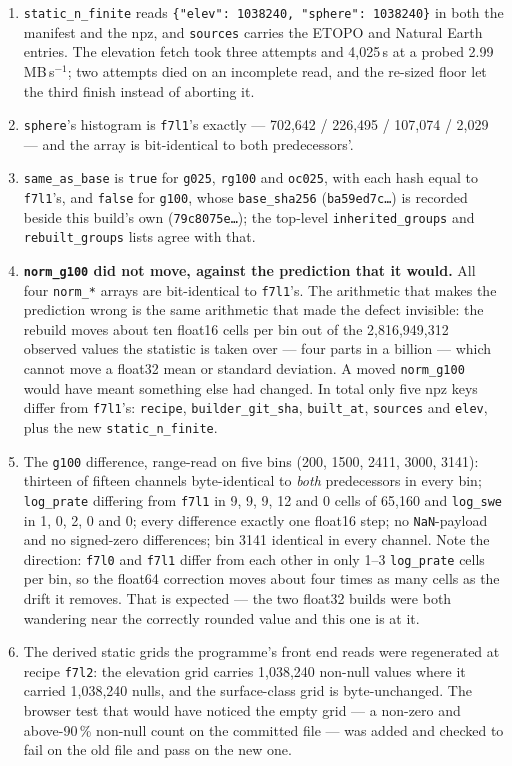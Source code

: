 \documentclass[10pt]{article}
\newcommand{\code}[1]{\texttt{#1}}
\begin{document}
\begin{enumerate}\itemsep1pt
\item \code{static\_n\_finite} reads \code{\{"elev": 1038240, "sphere":
1038240\}} in both the manifest and the npz, and \code{sources} carries the
ETOPO and Natural Earth entries. The elevation fetch took three attempts and
4,025\,s at a probed 2.99\,MB\,s$^{-1}$; two attempts died on an incomplete
read, and the re-sized floor let the third finish instead of aborting it.
\item \code{sphere}'s histogram is \code{f7l1}'s exactly --- 702,642 / 226,495
/ 107,074 / 2,029 --- and the array is bit-identical to both predecessors'.
\item \code{same\_as\_base} is \code{true} for \code{g025}, \code{rg100} and
\code{oc025}, with each hash equal to \code{f7l1}'s, and \code{false} for
\code{g100}, whose \code{base\_sha256} (\code{ba59ed7c\dots}) is recorded
beside this build's own (\code{79c8075e\dots}); the top-level
\code{inherited\_groups} and \code{rebuilt\_groups} lists agree with that.
\item \textbf{\code{norm\_g100} did not move, against the prediction that it
would.} All four \code{norm\_*} arrays are bit-identical to \code{f7l1}'s. The
arithmetic that makes the prediction wrong is the same arithmetic that made
the defect invisible: the rebuild moves about ten float16 cells per bin out of
the 2,816,949,312 observed values the statistic is taken over --- four parts in
a billion --- which cannot move a float32 mean or standard deviation. A moved
\code{norm\_g100} would have meant something else had changed. In total only
five npz keys differ from \code{f7l1}'s: \code{recipe},
\code{builder\_git\_sha}, \code{built\_at}, \code{sources} and \code{elev},
plus the new \code{static\_n\_finite}.
\item The \code{g100} difference, range-read on five bins (200, 1500, 2411,
3000, 3141): thirteen of fifteen channels byte-identical to \emph{both}
predecessors in every bin; \code{log\_prate} differing from \code{f7l1} in 9,
9, 9, 12 and 0 cells of 65,160 and \code{log\_swe} in 1, 0, 2, 0 and 0; every
difference exactly one float16 step; no \code{NaN}-payload and no signed-zero
differences; bin 3141 identical in every channel. Note the direction:
\code{f7l0} and \code{f7l1} differ from each other in only 1--3
\code{log\_prate} cells per bin, so the float64 correction moves about four
times as many cells as the drift it removes. That is expected --- the two
float32 builds were both wandering near the correctly rounded value and this
one is at it.
\item The derived static grids the programme's front end reads were
regenerated at recipe \code{f7l2}: the elevation grid carries 1,038,240
non-null values where it carried 1,038,240 nulls, and the surface-class grid
is byte-unchanged. The browser test that would have noticed the empty grid ---
a non-zero and above-90\,\% non-null count on the committed file --- was added
and checked to fail on the old file and pass on the new one.
\end{enumerate}
\end{document}
